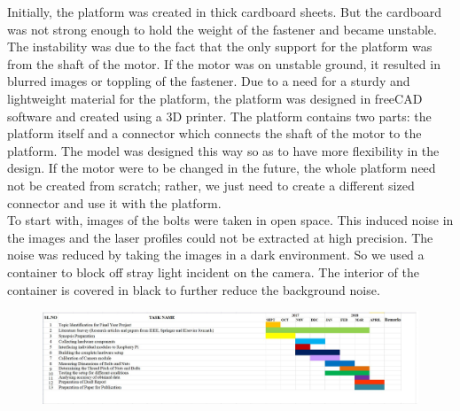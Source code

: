 \documentclass[12pt]{report}
\begin{document}
Initially, the platform was created in thick cardboard sheets. But the cardboard was not strong enough to hold the weight of the fastener and became unstable. The instability was due to the fact that the only support for the platform was from the shaft of the motor. If the motor was on unstable ground, it resulted in blurred images or toppling of the fastener. Due to a need for a sturdy and lightweight material for the platform, the platform was designed in freeCAD software and created using a 3D printer.
The platform contains two parts: the platform itself and a connector which connects the shaft of the motor to the platform. The model was designed this way so as to have more flexibility in the design. If the motor were to be changed in the future, the whole platform need not be created from scratch; rather, we just need to create a different sized connector and use it with the platform.\\ 

To start with, images of the bolts were taken in open space. This induced noise in the images and the laser profiles could not be extracted at high precision. The noise was reduced by taking the images in a dark environment. So we used a container to block off stray light incident on the camera. The interior of the container is covered in black to further reduce the background noise.


\newpage
\begin{figure}[h]
\centering
\includegraphics[width=1.3\textwidth, height=0.4\textwidth, angle=90]{pertchart.jpg}
\end{figure}
\end{document}
